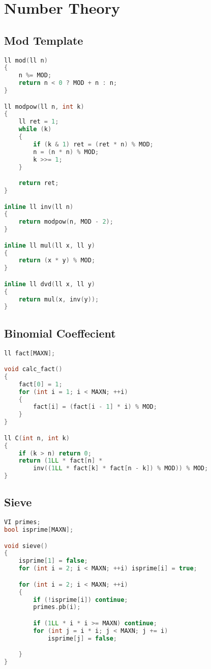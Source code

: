 \chapter{Number Theory}

\section{Mod Template}
\begin{lstlisting}[language=C++]
ll mod(ll n)
{
    n %= MOD;
    return n < 0 ? MOD + n : n;
}

ll modpow(ll n, int k)
{
    ll ret = 1;
    while (k)
    {
        if (k & 1) ret = (ret * n) % MOD;
        n = (n * n) % MOD;
        k >>= 1;
    }

    return ret;
}

inline ll inv(ll n)
{
    return modpow(n, MOD - 2);
}

inline ll mul(ll x, ll y)
{
    return (x * y) % MOD;
}

inline ll dvd(ll x, ll y)
{
    return mul(x, inv(y));
}
\end{lstlisting}
\sectionend

\section{Binomial Coeffecient}
\begin{lstlisting}[language=C++]
ll fact[MAXN];

void calc_fact()
{
    fact[0] = 1;
    for (int i = 1; i < MAXN; ++i)
    {
        fact[i] = (fact[i - 1] * i) % MOD;
    }
}

ll C(int n, int k)
{
    if (k > n) return 0;
    return (1LL * fact[n] *
        inv((1LL * fact[k] * fact[n - k]) % MOD)) % MOD;
}
\end{lstlisting}
\sectionend

\section{Sieve}
\begin{lstlisting}[language=C++]
VI primes;
bool isprime[MAXN];

void sieve()
{
    isprime[1] = false;
    for (int i = 2; i < MAXN; ++i) isprime[i] = true;

    for (int i = 2; i < MAXN; ++i)
    {
        if (!isprime[i]) continue;
        primes.pb(i);

        if (1LL * i * i >= MAXN) continue;
        for (int j = i * i; j < MAXN; j += i)
            isprime[j] = false;

    }
}
\end{lstlisting}
\sectionend
